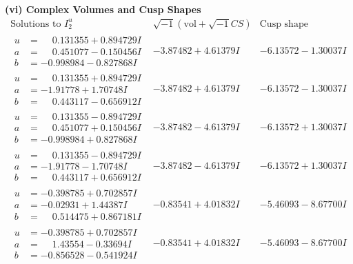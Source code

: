 \documentclass[1p]{elsarticle_modified}
\theoremstyle{definition}
\newcommand{\I}{\sqrt{-1}}
\begin{document}
\newpage\flushleft \textbf{(vi) Complex Volumes and Cusp Shapes}
$$\begin{array}{c|c|c}  
\text{Solutions to }I^u_{2}& \I (\text{vol} + \sqrt{-1}CS) & \text{Cusp shape}\\
 \hline 
\begin{aligned}
u &= \phantom{-}0.131355 + 0.894729 I \\
a &= \phantom{-}0.451077 - 0.150456 I \\
b &= -0.998984 - 0.827868 I\end{aligned}
 & -3.87482 + 4.61379 I & -6.13572 - 1.30037 I \\ \hline\begin{aligned}
u &= \phantom{-}0.131355 + 0.894729 I \\
a &= -1.91778 + 1.70748 I \\
b &= \phantom{-}0.443117 - 0.656912 I\end{aligned}
 & -3.87482 + 4.61379 I & -6.13572 - 1.30037 I \\ \hline\begin{aligned}
u &= \phantom{-}0.131355 - 0.894729 I \\
a &= \phantom{-}0.451077 + 0.150456 I \\
b &= -0.998984 + 0.827868 I\end{aligned}
 & -3.87482 - 4.61379 I & -6.13572 + 1.30037 I \\ \hline\begin{aligned}
u &= \phantom{-}0.131355 - 0.894729 I \\
a &= -1.91778 - 1.70748 I \\
b &= \phantom{-}0.443117 + 0.656912 I\end{aligned}
 & -3.87482 - 4.61379 I & -6.13572 + 1.30037 I \\ \hline\begin{aligned}
u &= -0.398785 + 0.702857 I \\
a &= -0.02931 + 1.44387 I \\
b &= \phantom{-}0.514475 + 0.867181 I\end{aligned}
 & -0.83541 + 4.01832 I & -5.46093 - 8.67700 I \\ \hline\begin{aligned}
u &= -0.398785 + 0.702857 I \\
a &= \phantom{-}1.43554 - 0.33694 I \\
b &= -0.856528 - 0.541924 I\end{aligned}
 & -0.83541 + 4.01832 I & -5.46093 - 8.67700 I \\ \hline\begin{aligned}

\end{aligned}
\end{array}$$
\end{document}
